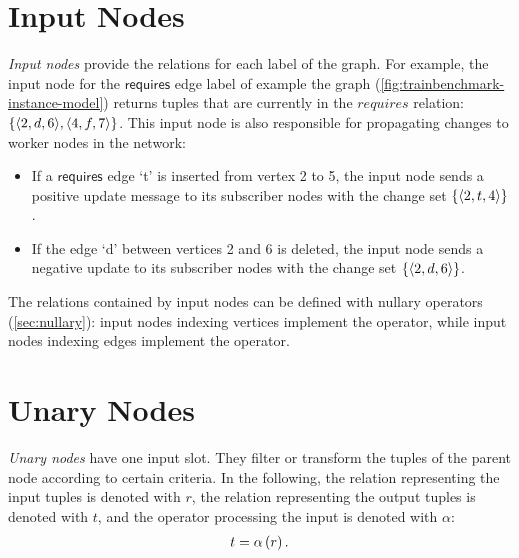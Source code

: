 \section{Input Nodes}


\emph{Input nodes} %
provide the relations for each label of the graph. For example, the input node for the $\mathsf{requires}$ edge label of example the graph (\autoref{fig:trainbenchmark-instance-model}) returns tuples that are currently in the $\mathit{requires}$ relation: $ \left\{ \langle 2, d, 6 \rangle, \langle 4, f, 7 \rangle \right\} $. This input node is also responsible for propagating changes to worker nodes in the network:

\begin{itemize}
	\item If a $\mathsf{requires}$ edge `t' is inserted from vertex 2 to 5, the input node sends a positive update message to its subscriber nodes with the change set $ \left\{ \langle 2, t, 4 \rangle \right\} $.
	\item If the edge `d' between vertices 2 and 6 is deleted, the input node sends a negative update to its subscriber nodes with the change set $ \left\{ \langle 2, d, 6 \rangle \right\} $.
\end{itemize}

The relations contained by input nodes can be defined with nullary operators (\autoref{sec:nullary}): input nodes indexing vertices implement the \getverticestext operator, while input nodes indexing edges implement the \getedgestext operator.

\section{Unary Nodes}


\emph{Unary nodes} %
have one input slot. They filter or transform the tuples of the parent node according to certain criteria. In the following, the relation representing the input tuples is denoted with $r$, the relation representing the output tuples is denoted with $t$, and the operator processing the input is denoted with $\alpha$:
\begin{align*}
t = \mathrm{\alpha}\left(r\right).
\end{align*}

